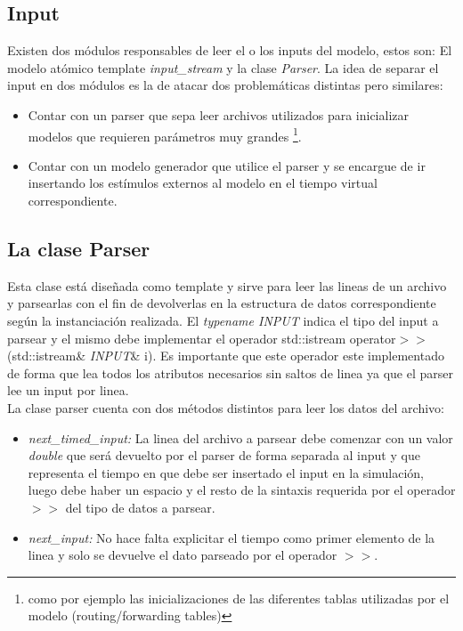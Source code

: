 \documentclass[10pt,a4paper]{article}
\begin{document}
\subsection{Input}
Existen dos módulos responsables de leer el o los inputs del modelo, estos son: El modelo atómico template \textit{input\_stream} y la clase \textit{Parser}. La idea de separar el input en dos módulos es la de atacar dos problemáticas distintas pero similares:

\begin{itemize}
\item Contar con un parser que sepa leer archivos utilizados para inicializar modelos que requieren parámetros muy grandes \footnote{como por ejemplo las inicializaciones de las diferentes tablas utilizadas por el modelo (routing/forwarding tables)}.
\item Contar con un modelo generador que utilice el parser y se encargue de ir insertando los estímulos externos al modelo en el tiempo virtual correspondiente.\\
\end{itemize}

\subsection{La clase Parser}
Esta clase está diseñada como template y sirve para leer las lineas de un archivo y parsearlas con el fin de devolverlas en la estructura de datos correspondiente según la instanciación realizada. El \textit{typename INPUT} indica el tipo del input a parsear y el mismo debe implementar el operador std::istream \textsf{operator}$>>$(\textsf{std::istream}\& \textit{INPUT}\& i). Es importante que este operador este implementado de forma que lea todos los atributos necesarios sin saltos de linea ya que el parser lee un input por linea.\\

La clase parser cuenta con dos métodos distintos para leer los datos del archivo:
\begin{itemize}
\item \textit{next\_timed\_input:} La linea del archivo a parsear debe comenzar con un valor \textit{double} que será devuelto por el parser de forma separada al input y que representa el tiempo en que debe ser insertado el input en la simulación, luego debe haber un espacio y el resto de la sintaxis requerida por el operador $>>$ del tipo de datos a parsear. 
\item \textit{next\_input:} No hace falta explicitar el tiempo como primer elemento de la linea y solo se devuelve el dato parseado por el operador $>>$.
\end{itemize}
\end{document}
